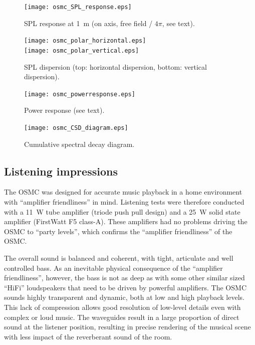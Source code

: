 \documentclass[12pt,a4paper]{article}
\providecommand{\figlabel}[1]{\label{fig:#1}}
\begin{document}
\begin{figure}[p]
	\centering
	\texttt{[image: osmc\_SPL\_response.eps]}
	\caption{SPL response at \SI{1}{m} (on axis, free field / $4\pi$, see text).}
	\figlabel{osmc_SPL_response}
\end{figure}

\begin{figure}[p]
	\centering
	\texttt{[image: osmc\_polar\_horizontal.eps]}\\
	\texttt{[image: osmc\_polar\_vertical.eps]}
	\caption{SPL dispersion (top: horizontal dispersion, bottom: vertical dispersion).}
	\figlabel{osmc_polar}
\end{figure}

\begin{figure}[p]
	\centering
	\texttt{[image: osmc\_powerresponse.eps]}
	\caption{Power response (see text).}
	\figlabel{osmc_powerresponse}
\end{figure}

\begin{figure}[p]
	\centering
	\texttt{[image: osmc\_CSD\_diagram.eps]}
	\caption{Cumulative spectral decay diagram.}
	\figlabel{osmc_CSD_diagram}
\end{figure}


\clearpage


\subsection{Listening impressions}
The OSMC was designed for accurate music playback in a home environment with ``amplifier friendliness'' in mind. Listening tests were therefore conducted with a \SI{11}{W} tube amplifier (triode push pull design) and a \SI{25}{W} solid state amplifier (FirstWatt F5 class-A). These amplifiers had no problems driving the OSMC to ``party levels'', which confirms the ``amplifier friendliness'' of the OSMC.\par

The overall sound is balanced and coherent, with tight, articulate and well controlled bass. As an inevitable physical consequence of the ``amplifier friendliness'', however, the bass is not as deep as with some other similar sized ``HiFi'' loudspeakers that need to be driven by powerful amplifiers. The OSMC sounds highly transparent and dynamic, both at low and high playback levels. This lack of compression allows good resolution of low-level details even with complex or loud music. The waveguides result in a large proportion of direct sound at the listener position, resulting in precise rendering of the musical scene with less impact of the reverberant sound of the room.

\clearpage



\end{document}
